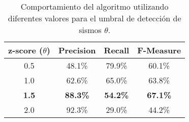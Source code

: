 \begin{table}
\centering
\begin{tabular}{cccc}
\toprule
{z-score ($\theta$)} & {Precision} & {Recall} & {F-Measure} \\ 
\midrule
{0.5}    & {48.1\%}     & {79.9\%}  & {60.1\%}  \\ 
{1.0}    & {62.6\%}     & {65.0\%}  & {63.8\%}  \\ 
{\bf 1.5}    & {\bf 88.3\%}     & {\bf 54.2\%}  & {\bf 67.1\%}  \\
{2.0}    & {92.3\%}     & {29.0\%}  & {44.2\%}  \\ 
\bottomrule
\end{tabular}
\caption{Comportamiento del algoritmo utilizando diferentes valores para el umbral de detecci\'on de sismos $\theta$.}
\label{table:zscore}
\end{table}
